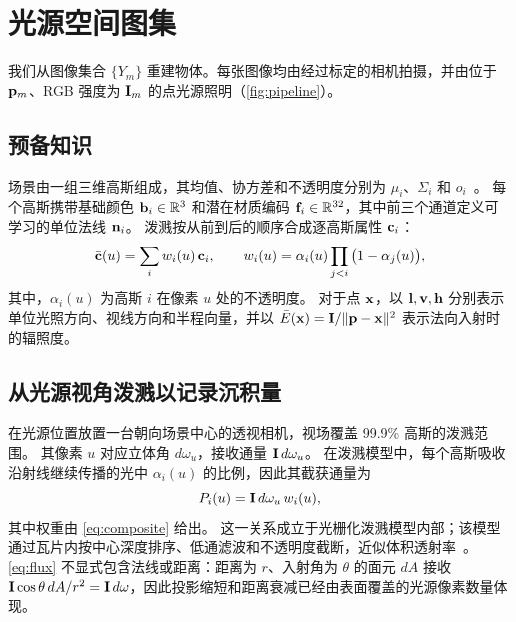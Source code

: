 \section{光源空间图集}
\label{sec:method}



我们从图像集合 $\{Y_m\}$ 重建物体。每张图像均由经过标定的相机拍摄，并由位于 $\mathbf{p}_m$、RGB 强度为 $\mathbf{I}_m$ 的点光源照明（\cref{fig:pipeline}）。

\subsection{预备知识}
\label{sec:prelim}
场景由一组三维高斯组成，其均值、协方差和不透明度分别为 $\mu_i$、$\Sigma_i$ 和 $o_i$~\cite{kerbl20233d}。
每个高斯携带基础颜色 $\mathbf{b}_i\in\mathbb R^3$ 和潜在材质编码 $\mathbf{f}_i\in\mathbb R^{32}$，其中前三个通道定义可学习的单位法线 $\mathbf{n}_i$。
泼溅按从前到后的顺序合成逐高斯属性 $\mathbf{c}_i$：
\begin{equation}
  \bar{\mathbf{c}}(u)=\sum_i w_i(u)\,\mathbf{c}_i,\qquad w_i(u)=\alpha_i(u)\prod_{j<i}\big(1-\alpha_j(u)\big),
  \label{eq:composite}
\end{equation}
其中，$\alpha_i(u)$ 为高斯 $i$ 在像素 $u$ 处的不透明度。
对于点 $\mathbf{x}$，以 $\mathbf{l},\mathbf{v},\mathbf{h}$ 分别表示单位光照方向、视线方向和半程向量，并以 $\bar E(\mathbf{x})=\mathbf{I}/\|\mathbf{p}-\mathbf{x}\|^2$ 表示法向入射时的辐照度。

\subsection{从光源视角泼溅以记录沉积量}
\label{sec:deposit}
在光源位置放置一台朝向场景中心的透视相机，视场覆盖 99.9\% 高斯的泼溅范围。
其像素 $u$ 对应立体角 $d\omega_u$，接收通量 $\mathbf{I}\,d\omega_u$。
在泼溅模型中，每个高斯吸收沿射线继续传播的光中 $\alpha_i(u)$ 的比例，因此其截获通量为
\begin{equation}
  P_i(u)=\mathbf{I}\,d\omega_u\,w_i(u),
  \label{eq:flux}
\end{equation}
其中权重由 \cref{eq:composite} 给出。
这一关系成立于光栅化泼溅模型内部；该模型通过瓦片内按中心深度排序、低通滤波和不透明度截断，近似体积透射率~\cite{radl2024stopthepop,huang2024error,talegaonkar2025volumetrically,yu2024mip}。
\cref{eq:flux} 不显式包含法线或距离：距离为 $r$、入射角为 $\theta$ 的面元 $dA$ 接收 $\mathbf{I}\cos\theta\,dA/r^2=\mathbf{I}\,d\omega$，因此投影缩短和距离衰减已经由表面覆盖的光源像素数量体现。


